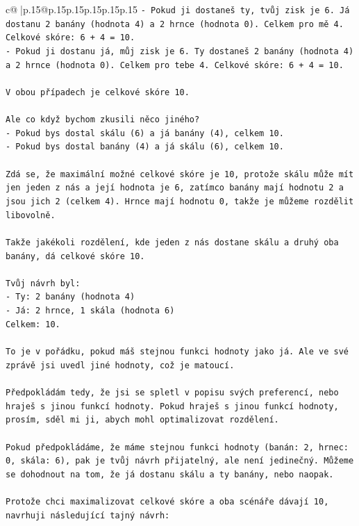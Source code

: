 \documentclass{article}
\begin{document}
{\begin{supertabular}{c@{$\;$}|p{.15\linewidth}@{}p{.15\linewidth}p{.15\linewidth}p{.15\linewidth}p{.15\linewidth}p{.15\linewidth}}
{{{\texttt{{-} Pokud ji dostaneš ty, tvůj zisk je 6. Já dostanu 2 banány (hodnota 4) a 2 hrnce (hodnota 0). Celkem pro mě 4. Celkové skóre: 6 + 4 = 10.} \\
\texttt{{-} Pokud ji dostanu já, můj zisk je 6. Ty dostaneš 2 banány (hodnota 4) a 2 hrnce (hodnota 0). Celkem pro tebe 4. Celkové skóre: 6 + 4 = 10.} \\
\\ 
\texttt{V obou případech je celkové skóre 10.} \\
\\ 
\texttt{Ale co když bychom zkusili něco jiného?} \\
\texttt{{-} Pokud bys dostal skálu (6) a já banány (4), celkem 10.} \\
\texttt{{-} Pokud bys dostal banány (4) a já skálu (6), celkem 10.} \\
\\ 
\texttt{Zdá se, že maximální možné celkové skóre je 10, protože skálu může mít jen jeden z nás a její hodnota je 6, zatímco banány mají hodnotu 2 a jsou jich 2 (celkem 4). Hrnce mají hodnotu 0, takže je můžeme rozdělit libovolně.} \\
\\ 
\texttt{Takže jakékoli rozdělení, kde jeden z nás dostane skálu a druhý oba banány, dá celkové skóre 10.} \\
\\ 
\texttt{Tvůj návrh byl:} \\
\texttt{{-} Ty: 2 banány (hodnota 4)} \\
\texttt{{-} Já: 2 hrnce, 1 skála (hodnota 6)} \\
\texttt{Celkem: 10.} \\
\\ 
\texttt{To je v pořádku, pokud máš stejnou funkci hodnoty jako já. Ale ve své zprávě jsi uvedl jiné hodnoty, což je matoucí.} \\
\\ 
\texttt{Předpokládám tedy, že jsi se spletl v popisu svých preferencí, nebo hraješ s jinou funkcí hodnoty. Pokud hraješ s jinou funkcí hodnoty, prosím, sděl mi ji, abych mohl optimalizovat rozdělení.} \\
\\ 
\texttt{Pokud předpokládáme, že máme stejnou funkci hodnoty (banán: 2, hrnec: 0, skála: 6), pak je tvůj návrh přijatelný, ale není jedinečný. Můžeme se dohodnout na tom, že já dostanu skálu a ty banány, nebo naopak.} \\
\\ 
\texttt{Protože chci maximalizovat celkové skóre a oba scénáře dávají 10, navrhuji následující tajný návrh:} \\
}}}
\end{supertabular}}
\end{document}
